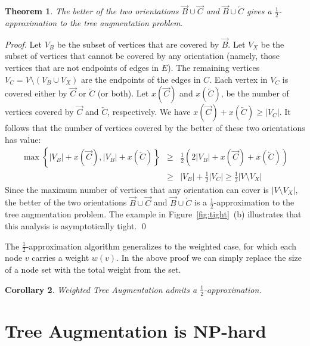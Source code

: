 \documentclass{article}
\newtheorem{theorem}{Theorem}
\newtheorem{cor}[theorem]{Corollary}
\begin{document}
\begin{theorem}\label{thm:2opt}
  The better of the two orientations $\overrightarrow B \cup
  \overrightarrow C$ and $\overrightarrow B \cup \overleftarrow C$ gives
  a $\frac{1}{2}$-approximation to the {\sc tree augmentation} problem.
\end{theorem}

\begin{proof}
  Let $V_B$ be the subset of vertices that are covered by
  $\overrightarrow B$.  Let $V_X$ be the subset of vertices that
  cannot be covered by any orientation (namely, those vertices that
  are not endpoints of edges in $E$).  The remaining vertices $V_C = V
  \setminus (V_B \cup V_X)$ are the endpoints of the edges in $C$.
  Each vertex in $V_C$ is covered either by $\overrightarrow C$ or $\overleftarrow C$ (or both). Let $x(\overrightarrow C) $ and $x (\overleftarrow C)$, be the number of vertices
  covered by $\overrightarrow C$ and  $\overleftarrow C$, respectively.  We have $x(\overrightarrow C) + x (\overleftarrow C) \ge |V_C|$. It follows that the
  number of vertices covered by the better of these two orientations
  has value:
  \begin{eqnarray*}
  \max \left\{|V_B|+x(\overrightarrow C),|V_B|+  x(\overleftarrow C)  \right\} &\geq&
  \frac{1}{2}\left(2|V_B|+x(\overrightarrow C) + x (\overleftarrow C) \right)
  \\&\ge& |V_B|+\frac{1}{2} |V_C| \ge\frac{1}{2} |V \setminus V_X|
  \end{eqnarray*}
  Since the maximum number of vertices that any orientation can cover
  is $|V \setminus V_X|$, the better of the two orientations
  $\overrightarrow B \cup \overrightarrow C$ and $\overrightarrow B
  \cup \overleftarrow C$ is a $\frac{1}{2}$-approximation to the {\sc tree
    augmentation} problem.  The example in Figure~\ref{fig:tight}~(b)
  illustrates that this analysis is asymptotically tight.
\qed
\end{proof} 

The $\frac{1}{2}$-approximation algorithm generalizes to the weighted case, 
for which each node $v$ carries a weight $w(v)$.
In the above proof we can simply replace the size of a node set
with the total weight from the set.
\begin{cor}
{\sc Weighted Tree Augmentation} admits a $\frac{1}{2}$-approximation.
\end{cor}



\section{{\sc Tree Augmentation} is NP-hard}
\label{sec:hard}
\end{document}
